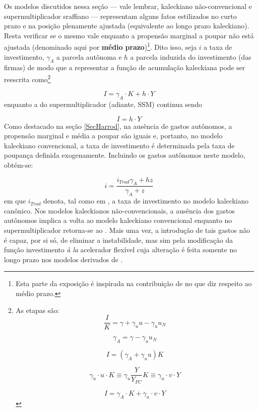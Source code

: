 Os modelos discutidos nessa seção --- vale lembrar, kaleckiano não-convencional e supermultiplicador sraffiano --- representam alguns fatos estilizados no curto prazo e na posição plenamente ajustada (equivalente ao longo prazo kaleckiano). Resta verificar se o mesmo vale enquanto a propensão marginal a poupar não está ajustada (denominado aqui por  \textbf{médio prazo})\footnote{Esta parte da exposição é inspirada na contribuição de \textcite{fagundes_role_2017} no que diz respeito ao médio prazo.}. 
Dito isso, seja $i$ a taxa de investimento, $\gamma_A$ a parcela autônoma e $h$ a parcela induzida do investimento (das firmas) de modo que a representar a função de acumulação kaleckiana pode ser reescrita como\footnote{
	As etapas são:
	$$
	\frac{I}{K}  = \gamma + \gamma_uu - \gamma_uu_N
	$$
	
	$$
	\gamma_A = \gamma - \gamma_uu_N
	$$
	
	$$
	I = (\gamma_A + \gamma_uu)K
	$$
	
	$$
	\gamma_u\cdot u \cdot K \equiv \gamma_u\frac{Y}{Y_{FC}}K \equiv \gamma_u\cdot v\cdot Y
	$$
	
	$$
	I = \gamma_A\cdot K + \gamma_u\cdot v\cdot Y
	$$
}

\begin{equation}
\tag{kaleckiana}
I = \gamma_A\cdot K + h\cdot Y
\end{equation}
enquanto a do supermultiplicador (adiante, SSM) continua sendo

\begin{equation}
\tag{SSM}
I = h\cdot Y
\end{equation}
Como destacado na seção \ref{SecHarrod}, na ausência de gastos autônomos, a propensão marginal e média a poupar são iguais e, portanto, no modelo kaleckiano convencional, a taxa de investimento é determinada pela taxa de poupança definida exogenamente. Incluindo os gastos autônomos neste modelo, obtém-se:

$$
i = \frac{i_{Trad}\gamma_A + hz}{\gamma_A + z}
$$
em que $i_{Trad}$ denota, tal como em \textcite{fagundes_role_2017}, a taxa de investimento no modelo kaleckiano canônico. Nos modelos kaleckianos não-convencionais, a ausência dos gastos autônomos implica a volta ao modelo kaleckiano convencional enquanto no supermultiplicador retorna-se ao \textcite{harrod_essay_1939}. Mais uma vez, a introdução de tais gastos não é capaz, por si só, de eliminar a instabilidade, mas sim pela modificação da função investimento \textit{à la} acelerador flexível cuja alteração é feita somente no longo prazo nos modelos derivados de \textcite{allain_tackling_2015}. 

